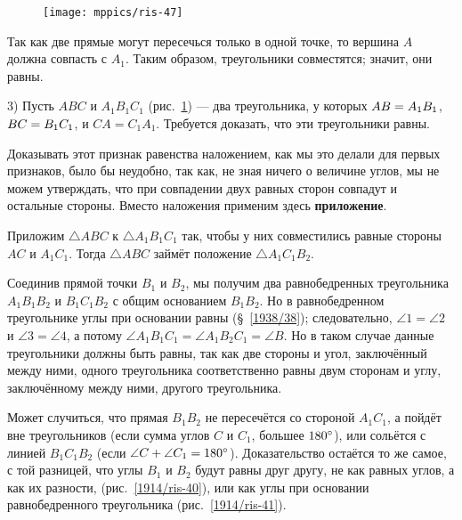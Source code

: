 \documentclass[twoside]{book}
\begin{document}
\begin{figure}
\vskip-0mm
\centering
\texttt{[image: mppics/ris-47]}
\caption{}\label{1938/ris-47}
\end{figure}

Так как две прямые могут пересечься только в одной точке, то вершина $A$ должна совпасть с $A_1$.
Таким образом, треугольники совместятся;
значит, они равны.

3) Пусть $ABC$ и $A_1B_1C_1$ (рис.~\ref{1938/ris-47}) — два треугольника, у которых
$AB \z= A_1B_1$,
$BC \z= B_1C_1$,
и
$CA = C_1A_1$.
Требуется доказать, что эти треугольники равны.

Доказывать этот признак равенства наложением, как мы это делали для первых признаков, было бы неудобно, так как, не зная ничего о величине углов, мы не можем утверждать, что при совпадении двух равных сторон совпадут и остальные стороны.
Вместо наложения применим здесь \textbf{приложение}.

Приложим $\triangle ABC$ к $\triangle A_1B_1C_1$ так, чтобы у них совместились равные стороны $AC$ и $A_1C_1$.
Тогда $\triangle ABC$ займёт положение $\triangle A_1C_1B_2$.

Соединив прямой точки $B_1$ и $B_2$, мы получим два равнобедренных треугольника $A_1B_1B_2$ и $B_1C_1B_2$ с общим основанием $B_1B_2$.
Но в равнобедренном треугольнике углы при основании равны (§~\ref{1938/38});
следовательно, $\angle 1 = \angle 2$ и $\angle 3 = \angle 4$, а потому $\angle A_1B_1C_1 = \angle A_1B_2C_1 = \angle B$.
Но в таком случае данные треугольники должны быть равны, так как две стороны и угол, заключённый между ними, одного треугольника соответственно равны двум сторонам и углу, заключённому между ними, другого треугольника.


Может случиться, что прямая $B_1B_2$ не пересечётся со стороной $A_1C_1$,
а пойдёт вне треугольников (если сумма углов $C$ и $C_1$, большее $180\degree$),
или сольётся с линией $B_1C_1B_2$ (если $\angle C +\angle  C_1 \z= 180\degree$). Доказательство остаётся то же самое, с той разницей, что углы $B_1$ и $B_2$
будут равны друг другу, не как  равных углов, а как их разности, (рис.~\ref{1914/ris-40}), или как углы при основании равнобедренного треугольника (рис.~\ref{1914/ris-41}).
\end{document}
